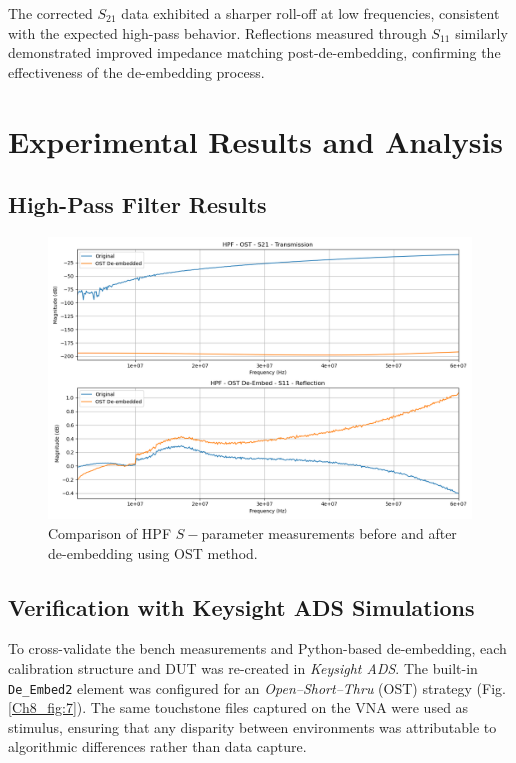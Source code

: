 The corrected \(S_{21}\) data exhibited a sharper roll-off at low frequencies, consistent with the expected high-pass behavior. Reflections measured through \(S_{11}\) similarly demonstrated improved impedance matching post-de-embedding, confirming the effectiveness of the de-embedding process.

\section{Experimental Results and Analysis}
\justifying

\subsection{High-Pass Filter Results}
\begin{figure}[H]
\centering
\includegraphics[width=1\textwidth]{Chapter_8/images/Lab_08_hpf_deembedded_comparison.png}
\caption{Comparison of HPF $S-$parameter measurements before and after de-embedding using OST method.}
\label{Ch8_fig:6}
\end{figure}

\newpage

\subsection{Verification with Keysight ADS Simulations}
\justifying
To cross-validate the bench measurements and Python-based de-embedding, each calibration structure and DUT was re-created in \emph{Keysight ADS}. The built-in \texttt{De\_Embed2} element was configured for an \emph{Open–Short–Thru} (OST) strategy (Fig.\ref{Ch8_fig:7}). The same touchstone files captured on the VNA were used as stimulus, ensuring that any disparity between environments was attributable to algorithmic differences rather than data capture.
\par
\vspace{0.3cm}
\noindent
